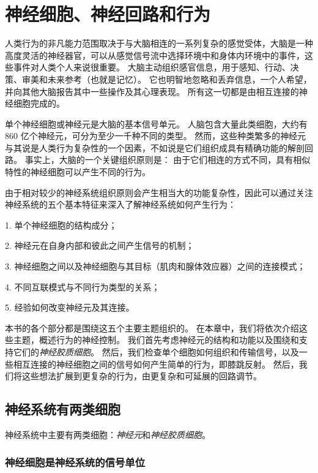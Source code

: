 \chapter{神经细胞、神经回路和行为} \label{chap:chap3}

人类行为的非凡能力范围取决于与大脑相连的一系列复杂的感觉受体，大脑是一种高度灵活的神经器官，可以从感觉信号流中选择环境中和身体内环境中的事件，这些事件对人类个人来说很重要。
大脑主动组织感官信息，用于感知、行动、决策、审美和未来参考（也就是记忆）。
它也明智地忽略和丢弃信息，一个人希望，并向其他大脑报告其中一些操作及其心理表现。
所有这一切都是由相互连接的神经细胞完成的。


单个神经细胞或神经元是大脑的基本信号单元。 
人脑包含大量此类细胞，大约有 860 亿个神经元，可分为至少一千种不同的类型。 
然而，这些种类繁多的神经元与其说是人类行为复杂性的一个因素，不如说是它们组织成具有精确功能的解剖回路。 
事实上，大脑的一个关键组织原则是：
由于它们相连的方式不同，具有相似特性的神经细胞可以产生不同的行为。


由于相对较少的神经系统组织原则会产生相当大的功能复杂性，因此可以通过关注神经系统的五个基本特征来深入了解神经系统如何产生行为：

1. 单个神经细胞的结构成分；

2. 神经元在自身内部和彼此之间产生信号的机制；

3. 神经细胞之间以及神经细胞与其目标（肌肉和腺体效应器）之间的连接模式；

4. 不同互联模式与不同行为类型的关系；

5. 经验如何改变神经元及其连接。


本书的各个部分都是围绕这五个主要主题组织的。 
在本章中，我们将依次介绍这些主题，概述行为的神经控制。
我们首先考虑神经元的结构和功能以及围绕和支持它们的\textit{神经胶质细胞}。
然后，我们检查单个细胞如何组织和传输信号，以及一些相互连接的神经细胞之间的信号如何产生简单的行为，即膝跳反射。
然后，我们将这些想法扩展到更复杂的行为，由更复杂和可延展的回路调节。



\section{神经系统有两类细胞}

神经系统中主要有两类细胞：\textit{神经元}和\textit{神经胶质细胞}。


\subsection{神经细胞是神经系统的信号单位}

